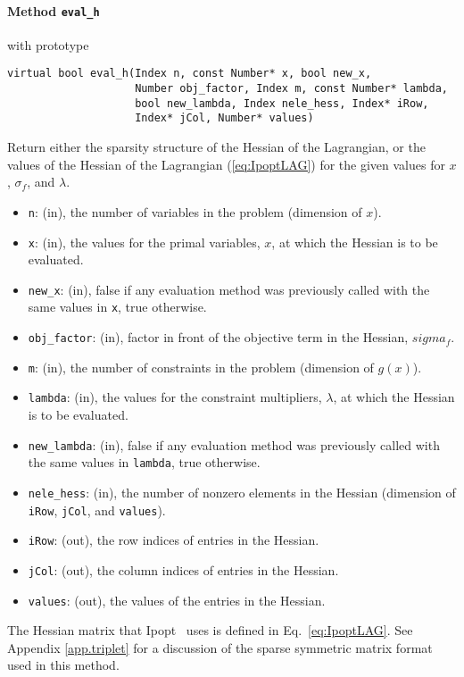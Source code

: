 \documentclass[10pt]{article}
\newcommand{\Ipopt}{{\sc Ipopt }}
\begin{document}
\paragraph{Method {\texttt{eval\_h}}} with prototype
\begin{verbatim}
virtual bool eval_h(Index n, const Number* x, bool new_x,
                    Number obj_factor, Index m, const Number* lambda,
                    bool new_lambda, Index nele_hess, Index* iRow,
                    Index* jCol, Number* values)
\end{verbatim}
Return either the sparsity structure of the Hessian of the Lagrangian, or the values of the 
Hessian of the Lagrangian (\ref{eq:IpoptLAG}) for the given values for $x$,
$\sigma_f$, and $\lambda$.
\begin{itemize}
\item {\tt n}: (in), the number of variables in the problem (dimension
  of $x$).
\item {\tt x}: (in), the values for the primal variables, $x$, at which
  the Hessian is to be evaluated.
\item {\tt new\_x}: (in), false if any evaluation method was previously called 
        with the same values in {\tt x}, true otherwise.
\item {\tt obj\_factor}: (in), factor in front of the objective term
  in the Hessian, $sigma_f$.
\item {\tt m}: (in), the number of constraints in the problem (dimension of $g(x)$).
\item {\tt lambda}: (in), the values for the constraint multipliers,
  $\lambda$, at which the Hessian is to be evaluated.
\item {\tt new\_lambda}: (in), false if any evaluation method was
  previously called with the same values in {\tt lambda}, true
  otherwise.
\item {\tt nele\_hess}: (in), the number of nonzero elements in the
  Hessian (dimension of {\tt iRow}, {\tt jCol}, and {\tt values}).
\item {\tt iRow}: (out), the row indices of entries in the Hessian.
\item {\tt jCol}: (out), the column indices of entries in the Hessian.
\item {\tt values}: (out), the values of the entries in the Hessian.
\end{itemize}

The Hessian matrix that \Ipopt\ uses is defined in
Eq.~\ref{eq:IpoptLAG}.  See Appendix \ref{app.triplet} for a
discussion of the sparse symmetric matrix format used in this method.
\end{document}
